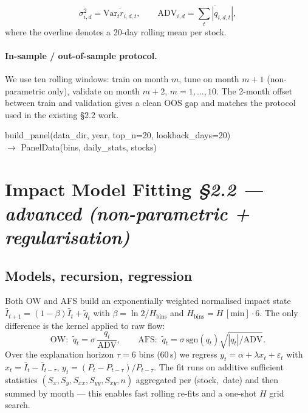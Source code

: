 \documentclass[11pt,a4paper]{article}
\begin{document}
\[
  \sigma_{i,d}^2 = \overline{\mathrm{Var}_t r_{i,d,t}},
  \qquad
  \mathrm{ADV}_{i,d} = \overline{\sum_t |q_{i,d,t}|},
\]
where the overline denotes a 20-day rolling mean per stock.

\paragraph{In-sample / out-of-sample protocol.}
We use ten rolling windows: train on month $m$, tune on month $m+1$
(non-parametric only), validate on month $m+2$, $m=1,\dots,10$.  The
2-month offset between train and validation gives a clean OOS gap and
matches the protocol used in the existing \S2.2 work.

\begin{sigbox}
\noindent
build\_panel(data\_dir, year, top\_n=20, lookback\_days=20)\\
\hspace*{1em}$\rightarrow$ PanelData(bins, daily\_stats, stocks)
\end{sigbox}

\section{Impact Model Fitting \hfill \normalsize\itshape \S2.2 --- advanced (non-parametric + regularisation)}
\label{sec:fit}

\subsection{Models, recursion, regression}

Both OW and AFS build an exponentially weighted normalised impact state
$\bar I_{t+1}=(1-\beta)\bar I_t + \tilde q_t$ with
$\beta=\ln 2/H_{\text{bins}}$ and $H_{\text{bins}}=H\,[\text{min}]\cdot 6$.
The only difference is the kernel applied to raw flow:
\[
  \text{OW:}\;\; \tilde q_t = \sigma\,\frac{q_t}{\mathrm{ADV}},
  \qquad
  \text{AFS:}\;\; \tilde q_t = \sigma\,\mathrm{sgn}(q_t)\sqrt{|q_t|/\mathrm{ADV}}.
\]
Over the explanation horizon $\tau=6$ bins (60\,s) we regress
$y_t = \alpha + \lambda x_t + \varepsilon_t$ with
$x_t = \bar I_t - \bar I_{t-\tau}$, $y_t = (P_t - P_{t-\tau})/P_{t-\tau}$.
The fit runs on additive sufficient statistics
$(S_x,S_y,S_{xx},S_{yy},S_{xy},n)$ aggregated per
(stock,~date) and then summed by month --- this enables fast rolling
re-fits and a one-shot $H$ grid search.
\end{document}
